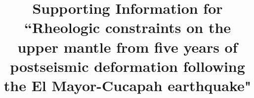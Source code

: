 \documentclass[draft,jgrga]{agutex}
\begin{document}
%
%


\title{Supporting Information for ``Rheologic constraints on the upper mantle from five years of postseismic deformation following the El Mayor-Cucapah earthquake"}


%
%




%
%

%
\end{document}
